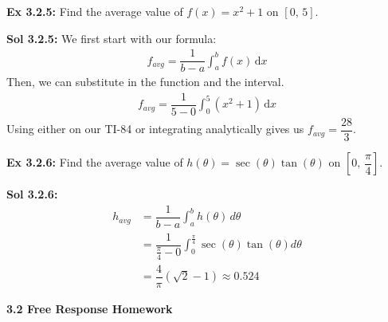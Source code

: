 \begin{tcolorbox}[example]
    \textbf{Ex 3.2.5: } Find the average value of $f(x) = x^2 + 1$ on $[0, \, 5]$.
\end{tcolorbox}
\begin{tcolorbox}[solution]
    \textbf{Sol 3.2.5: } We first start with our formula: \begin{align*}
        f_{avg} = \dfrac{1}{b - a}\int_a^b f(x) \,\mathrm{d}x
    \end{align*}
    Then, we can substitute in the function and the interval. \begin{align*}
        f_{avg} = \dfrac{1}{5 - 0}\int_0^5 \left(x^2 + 1\right) \,\mathrm{d}x
    \end{align*}
    Using either   on our TI-84 or integrating analytically gives us $f_{avg} = \boxed{\dfrac{28}{3}}$.
\end{tcolorbox} \vspace{11pt}

\begin{tcolorbox}[example]
    \textbf{Ex 3.2.6: } Find the average value of $h(\theta) = \sec (\theta)\tan (\theta)$ on $\left[0, \, \dfrac{\pi}{4}\right]$.
\end{tcolorbox}
\begin{tcolorbox}[solution]
    \textbf{Sol 3.2.6: } \begin{align*}
        h_{avg} &= \dfrac{1}{b - a}\int_a^b h(\theta) \, d\theta \\[5.5pt]
        & = \dfrac{1}{\frac{\pi}{4} - 0}\int_0^{\frac{\pi}{4}} \sec (\theta)\tan (\theta) d\theta \\[5.5pt]
        & = \boxed{\dfrac{4}{\pi}\left(\sqrt{2} - 1\right) \approx 0.524}
    \end{align*}
\end{tcolorbox}

\newpage

\textbf{\large{3.2 Free Response Homework}} \par

